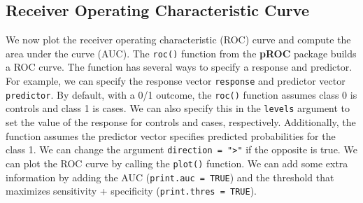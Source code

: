 \documentclass[
  letterpaper,
]{latex/krantz}
\makeatletter
\newenvironment{Shaded}{\begin{snugshade}}{\end{snugshade}}
\newcommand{\AttributeTok}[1]{\textcolor[rgb]{0.40,0.45,0.13}{#1}}
\newcommand{\ConstantTok}[1]{\textcolor[rgb]{0.56,0.35,0.01}{#1}}
\newcommand{\DecValTok}[1]{\textcolor[rgb]{0.68,0.00,0.00}{#1}}
\newcommand{\FunctionTok}[1]{\textcolor[rgb]{0.28,0.35,0.67}{#1}}
\newcommand{\NormalTok}[1]{\textcolor[rgb]{0.00,0.23,0.31}{#1}}
\newcommand{\OtherTok}[1]{\textcolor[rgb]{0.00,0.23,0.31}{#1}}
\newcommand{\SpecialCharTok}[1]{\textcolor[rgb]{0.37,0.37,0.37}{#1}}
\newcommand{\StringTok}[1]{\textcolor[rgb]{0.13,0.47,0.30}{#1}}
\newenvironment{kframe}{%
\medskip{}
\setlength{\fboxsep}{.8em}
 \def\at@end@of@kframe{}%
 \ifinner\ifhmode%
  \def\at@end@of@kframe{\end{minipage}}%
  \begin{minipage}{\columnwidth}%
 \fi\fi%
 \def\FrameCommand##1{\hskip\@totalleftmargin \hskip-\fboxsep
 \colorbox{shadecolor}{##1}\hskip-\fboxsep
     \hskip-\linewidth \hskip-\@totalleftmargin \hskip\columnwidth}%
 \MakeFramed {\advance\hsize-\width
   \@totalleftmargin\z@ \linewidth\hsize
   \@setminipage}}%
 {\par\unskip\endMakeFramed%
 \at@end@of@kframe}
\renewenvironment{Shaded}{\begin{kframe}}{\end{kframe}}
\makeatother
\begin{document}
\subsection{\texorpdfstring{Receiver Operating Characteristic Curve
}{Receiver Operating Characteristic Curve }}\label{receiver-operating-characteristic-curve}

We now plot the receiver operating characteristic (ROC) curve and
compute the area under the curve (AUC). The
\texttt{roc()} function from the
\textbf{pROC} package  builds a ROC curve. The
function has several ways to specify a response and predictor. For
example, we can specify the response vector \texttt{response} and
predictor vector \texttt{predictor}. By default, with a 0/1 outcome, the
\texttt{roc()} function assumes class 0 is controls and class 1 is
cases. We can also specify this in the \texttt{levels} argument to set
the value of the response for controls and cases, respectively.
Additionally, the function assumes the predictor vector specifies
predicted probabilities for the class 1. We can change the argument
\texttt{direction\ =\ "\textgreater{}"} if the opposite is true. We can
plot the ROC curve by calling the
\texttt{plot()} function. We
can add some extra information by adding the AUC
(\texttt{print.auc\ =\ TRUE}) and the threshold that maximizes
sensitivity + specificity (\texttt{print.thres\ =\ TRUE}).

\begin{Shaded}
\end{Shaded}
\end{document}
